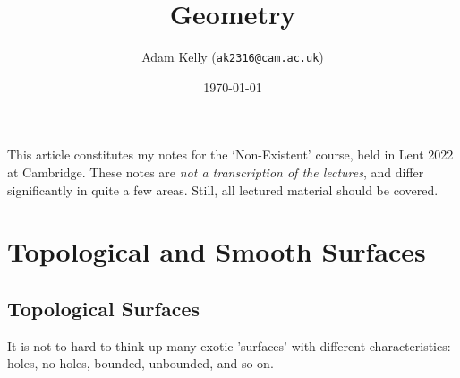 \documentclass[a4paper]{scrartcl}
\title{Geometry}
\author{Adam Kelly (\texttt{ak2316@cam.ac.uk})}
\date{\today}
\begin{document}
\maketitle


This article constitutes my notes for the `Non-Existent' course, held in Lent 2022 at Cambridge. These notes are \emph{not a transcription of the lectures}, and differ significantly in quite a few areas. Still, all lectured material should be covered.



\tableofcontents

\section{Topological and Smooth Surfaces}

\subsection{Topological Surfaces}


It is not to hard to think up many exotic 'surfaces' with different characteristics: holes, no holes, bounded, unbounded, and so on.
\end{document}

